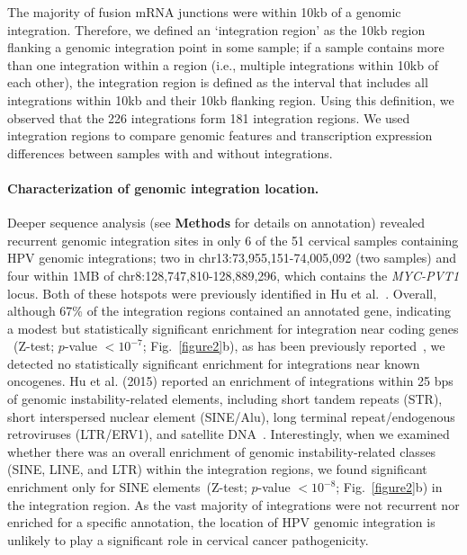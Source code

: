 \documentclass[a4,center,fleqn]{NAR}
\begin{document}
The majority of fusion mRNA junctions were within 10kb of a genomic
integration. Therefore, we defined an `integration region' as the 10kb
region flanking a genomic integration point in some sample; if a
sample contains more than one integration within a region (i.e.,
multiple integrations within 10kb of each other), the integration
region is defined as the interval that includes all integrations
within 10kb and their 10kb flanking region.  Using this definition, we
observed that the 226 integrations form 181 integration regions.  We
used integration regions to compare genomic features and transcription
expression differences between samples with and without integrations.

\paragraph{\textbf{Characterization of genomic integration location.}} Deeper sequence analysis (see \textbf{Methods} for details on
annotation) revealed recurrent genomic integration sites in only 6 of
the 51 cervical samples containing HPV genomic integrations; two in
chr13:73,955,151-74,005,092 (two samples) and four within 1MB of
chr8:128,747,810-128,889,296, which contains the \emph{MYC-PVT1} locus. Both
of these hotspots were previously identified
in Hu et al.~\cite{Hu2015}. Overall, although 67\% of the integration regions
contained an annotated gene, indicating a modest but statistically
significant enrichment for integration near coding genes ~(Z-test;
$p$-value $<10^{-7}$; Fig.~\ref{figure2}b), as has been previously
reported~\cite{Akagi2014}, we detected no statistically significant
enrichment for integrations near known oncogenes.  Hu et al. (2015)
reported an enrichment of integrations within 25 bps of genomic
instability-related elements, including short tandem repeats (STR),
short interspersed nuclear element (SINE/Alu), long terminal
repeat/endogenous retroviruses (LTR/ERV1), and satellite
DNA~\cite{Hu2015}.  Interestingly, when we examined whether there was
an overall enrichment of genomic instability-related classes (SINE,
LINE, and LTR) within the integration regions, we found significant
enrichment only for SINE elements~(Z-test; $p$-value $<10^{-8}$;
Fig.~\ref{figure2}b) in the integration region. As the vast majority
of integrations were not recurrent nor enriched for a specific
annotation, the location of HPV genomic integration is unlikely to
play a significant role in cervical cancer pathogenicity.
\end{document}
